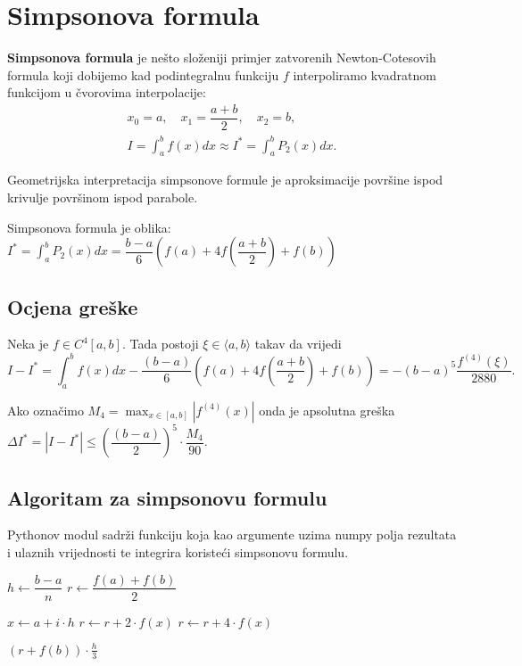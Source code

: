 \section{Simpsonova formula}

\textbf{Simpsonova formula} je nešto složeniji primjer zatvorenih Newton-Cotesovih
formula koji dobijemo kad podintegralnu funkciju $f$ interpoliramo kvadratnom
funkcijom u čvorovima interpolacije:
\begin{gather*}
    x_0 = a,\quad x_1=\dfrac{a+b}{2},\quad x_2 = b,\\
    I = \int_a^b f(x)dx \approx I^* = \int_a^b P_2(x)dx.
\end{gather*}

Geometrijska interpretacija simpsonove formule je aproksimacije površine ispod krivulje površinom ispod parabole.

Simpsonova formula je oblika: $\displaystyle
I^* = \int_a^b P_2(x)dx = \dfrac{b-a}{6}\left(f(a) + 4f\left(\dfrac{a+b}{2}\right) + f(b)\right)
$

\subsection{Ocjena greške}

Neka je $f\in C^4[a,b]$. Tada postoji $\xi \in \langle a,b\rangle$ takav da vrijedi
$$
I - I^* = \int_a^b f(x) dx - \dfrac{(b-a)}{6}\left(f(a) + 4f\left(\dfrac{a+b}{2}\right) + f(b)\right) = -(b-a)^5\dfrac{f^{(4)}(\xi)}{2880}.
$$

Ako označimo $\displaystyle M_4 = \max_{x\in[a,b]}|f^{(4)}(x)|$ onda je apsolutna
greška $\displaystyle \Delta I^* = |I - I^*| \leq \left(\dfrac{(b-a)}{2}\right)^5 \cdot \dfrac{M_4}{90}.$


\subsection{Algoritam za simpsonovu formulu}

Pythonov  modul sadrži  funkciju koja kao
argumente uzima numpy polja rezultata i ulaznih vrijednosti te integrira
koristeći simpsonovu formulu.

\begin{algorithmic}
    \State $h \gets \dfrac{b - a}{n}$
    \State $r \gets \dfrac{f(a) + f(b)}{2}$

        \State $x \gets a + i \cdot h$
            \State $r \gets r + 2 \cdot f(x)$
        \Else
            \State $r \gets r + 4 \cdot f(x)$
        \EndIf
    \EndFor

    \State \Return $(r + f(b)) \cdot \frac{h}{3}$
\EndFunction
\end{algorithmic}

